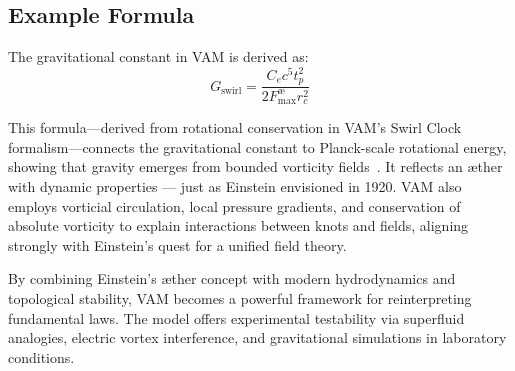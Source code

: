    \subsection*{Example Formula}

    The gravitational constant in VAM is derived as:
    \begin{equation}
        G_\text{swirl} = \frac{C_e c^5 t_p^2}{2 F^{\text{\ae}}_{\text{max}} r_c^2}
    \end{equation}

        This formula—derived from rotational conservation in VAM’s Swirl Clock formalism—connects the gravitational constant to Planck-scale rotational energy, showing that gravity emerges from bounded vorticity fields~\cite{iskandarani2024vam2}. It reflects an æther with dynamic properties — just as Einstein envisioned in 1920. VAM also employs vorticial circulation, local pressure gradients, and conservation of absolute vorticity to explain interactions between knots and fields, aligning strongly with Einstein’s quest for a unified field theory.

    By combining Einstein’s æther concept with modern hydrodynamics and topological stability, VAM becomes a powerful framework for reinterpreting fundamental laws. The model offers experimental testability via superfluid analogies, electric vortex interference, and gravitational simulations in laboratory conditions.